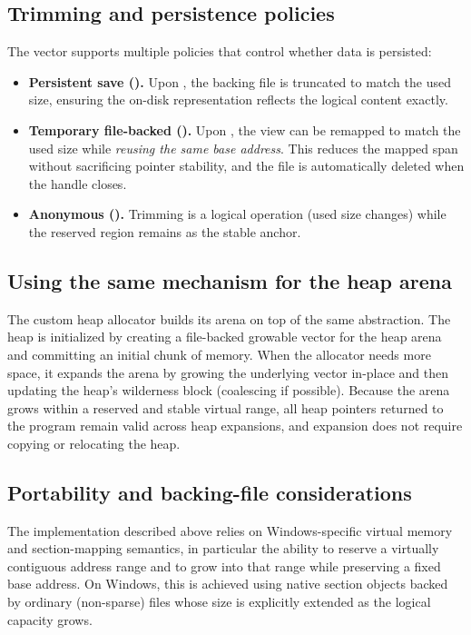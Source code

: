 \subsection{Trimming and persistence policies}
\label{sec:trim_persist}

The vector supports multiple policies that control whether data is persisted:
\begin{itemize}
  \item \textbf{Persistent save ().} Upon ,
  the backing file is truncated to match the used size, ensuring the on-disk
  representation reflects the logical content exactly.
  \item \textbf{Temporary file-backed ().} Upon
  , the view can be remapped to match the used size while
  \emph{reusing the same base address}. This reduces the mapped span without
  sacrificing pointer stability, and the file is automatically deleted when the
  handle closes.
  \item \textbf{Anonymous ().} Trimming is a logical operation
  (used size changes) while the reserved region remains as the stable anchor.
\end{itemize}

\subsection{Using the same mechanism for the heap arena}
\label{sec:heap_uses_growable_vector}

The custom heap allocator builds its arena on top of the same
 abstraction. The heap is initialized by
creating a file-backed growable vector for the heap arena and committing an
initial chunk of memory. When the allocator needs more space, it expands the
arena by growing the underlying vector in-place and then updating the heap's
wilderness block (coalescing if possible). Because the arena grows within a
reserved and stable virtual range, all heap pointers returned to the program
remain valid across heap expansions, and expansion does not require copying or
relocating the heap.

\subsection{Portability and backing-file considerations}
\label{sec:disk_backed_portability_notes}

The implementation described above relies on Windows-specific virtual memory and
section-mapping semantics, in particular the ability to reserve a virtually
contiguous address range and to grow into that range while preserving a fixed
base address. On Windows, this is achieved using native section objects backed by
ordinary (non-sparse) files whose size is explicitly extended as the logical
capacity grows.

